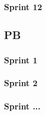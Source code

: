 \documentclass{article}
\begin{document}
            \subsubsection{Sprint 12}
        \subsection{PB}
            \subsubsection{Sprint 1}
            \subsubsection{Sprint 2}
            \subsubsection{Sprint ...}

\end{document}
